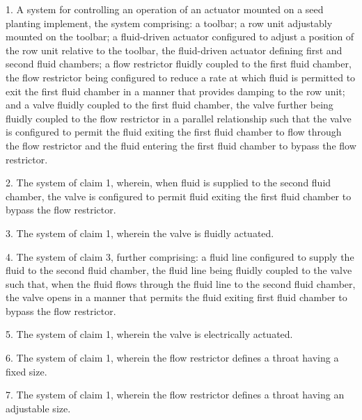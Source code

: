 \documentclass[11pt,a4paper]{article}
\begin{document}
1. A system for controlling an operation of an actuator mounted on a seed planting implement, the system comprising: a toolbar; a row unit adjustably mounted on the toolbar; a fluid-driven actuator configured to adjust a position of the row unit relative to the toolbar, the fluid-driven actuator defining first and second fluid chambers; a flow restrictor fluidly coupled to the first fluid chamber, the flow restrictor being configured to reduce a rate at which fluid is permitted to exit the first fluid chamber in a manner that provides damping to the row unit; and a valve fluidly coupled to the first fluid chamber, the valve further being fluidly coupled to the flow restrictor in a parallel relationship such that the valve is configured to permit the fluid exiting the first fluid chamber to flow through the flow restrictor and the fluid entering the first fluid chamber to bypass the flow restrictor.

2. The system of claim 1, wherein, when fluid is supplied to the second fluid chamber, the valve is configured to permit fluid exiting the first fluid chamber to bypass the flow restrictor.

3. The system of claim 1, wherein the valve is fluidly actuated.

4. The system of claim 3, further comprising: a fluid line configured to supply the fluid to the second fluid chamber, the fluid line being fluidly coupled to the valve such that, when the fluid flows through the fluid line to the second fluid chamber, the valve opens in a manner that permits the fluid exiting first fluid chamber to bypass the flow restrictor.

5. The system of claim 1, wherein the valve is electrically actuated.

6. The system of claim 1, wherein the flow restrictor defines a throat having a fixed size.

7. The system of claim 1, wherein the flow restrictor defines a throat having an adjustable size.
\end{document}
